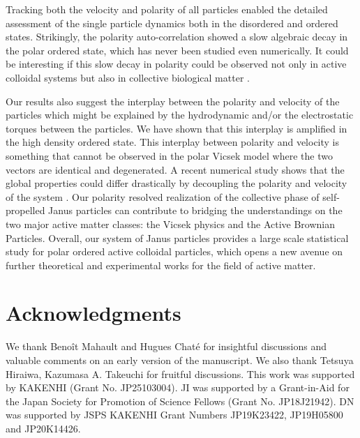 \documentclass[%
 reprint,
 amsmath,amssymb,
 aps,
 floatfix
]{revtex4-2}
\begin{document}
Tracking both the velocity and polarity of all particles enabled the detailed assessment of the single particle dynamics both in the disordered and ordered states.
Strikingly, the polarity auto-correlation showed a slow algebraic decay in the polar ordered state, which has never been studied even numerically. 
It could be interesting if this slow decay in polarity could be observed not only in active colloidal systems but also in collective biological matter \cite{shibata2019}. 

Our results also suggest the interplay between the polarity and velocity of the particles which might be explained by the hydrodynamic and/or the electrostatic torques between the particles.
We have shown that this interplay is amplified in the high density ordered state.
This interplay between polarity and velocity is something that cannot be observed in the polar Vicsek model where the two vectors are identical and degenerated.
A recent numerical study shows that the global properties could differ drastically by decoupling the polarity and velocity of the system \cite{benoit2018}.
Our polarity resolved realization of the collective phase of self-propelled Janus particles can contribute to bridging the understandings on the two major active matter classes: the Vicsek physics and the Active Brownian Particles.
Overall, our system of Janus particles provides a large scale statistical study for polar ordered active colloidal particles, which opens a new avenue on further theoretical and experimental works for the field of active matter.


\section{Acknowledgments}
We thank Beno\^{i}t Mahault and Hugues Chat\'{e} for insightful discussions and valuable comments on an early version of the manuscript. We also thank Tetsuya Hiraiwa, Kazumasa A. Takeuchi for fruitful discussions.
This work was supported by KAKENHI (Grant No. JP25103004). 
JI was supported by a Grant-in-Aid for the Japan Society for Promotion of Science Fellows (Grant No. JP18J21942). 
DN was supported by JSPS KAKENHI Grant Numbers JP19K23422, JP19H05800 and JP20K14426. 



\newpage
\ 
\newpage


\newpage

\newcommand{\beginsupplement}{
        \setcounter{table}{0}
        \renewcommand{\thetable}{S\arabic{table}}
        \setcounter{figure}{0}
        \renewcommand{\thefigure}{S\arabic{figure}}
        \setcounter{equation}{0}
        \renewcommand{\theequation}{S\arabic{equation}}
        \setcounter{section}{0}
        \renewcommand{\thesection}{S\Roman{section}}
     }
\end{document}
